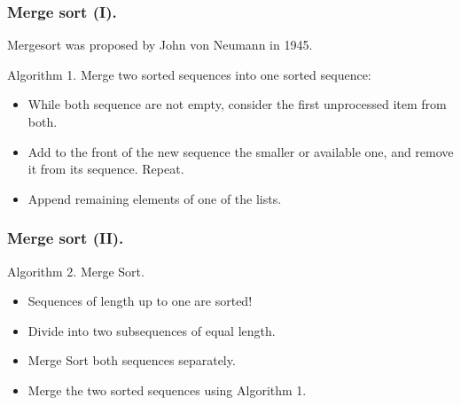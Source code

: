 \documentclass{beamer} %
\begin{document}
\begin{frame}
\frametitle{Merge sort (I).}

Mergesort was proposed by John von Neumann in 1945.

\vspace{5mm}
Algorithm 1. Merge two sorted sequences into one sorted sequence:
\begin{itemize}
\item While both sequence are not empty, consider the first unprocessed item from both.
\item Add to the front of the new sequence the smaller or available one, and remove it from its sequence. Repeat.
\item Append remaining elements of one of the lists.
\end{itemize}

\end{frame}

\begin{frame}
\frametitle{Merge sort (II).}

Algorithm 2. Merge Sort.
\begin{itemize}
\item Sequences of length up to one are sorted!
\item Divide into two subsequences of equal length.
\item Merge Sort both sequences separately.
\item Merge the two sorted sequences using Algorithm 1.
\end{itemize}

\end{frame}




\end{document}
